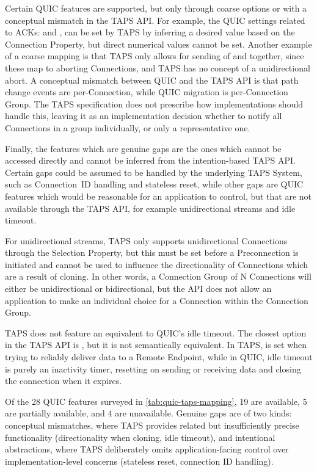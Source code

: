 Certain QUIC features are supported, but only through coarse options or with a conceptual mismatch in the TAPS API.
For example, the QUIC settings related to ACKs:  and ,
can be set by TAPS by inferring a desired value based on the 
Connection Property, but direct numerical values cannot be set.
Another example of a coarse mapping is that TAPS only allows for sending of
 and  together, since these map to
aborting Connections, and TAPS has no concept of a unidirectional abort.
A conceptual mismatch between QUIC and the TAPS API is that path change events are per-Connection,
while QUIC migration is per-Connection Group. The TAPS specification does not prescribe how
implementations should handle this, leaving it as an implementation decision
whether to notify all Connections in a group individually, or only a representative one.

Finally, the features which are genuine gaps are the ones which cannot be accessed directly
and cannot be inferred from the intention-based TAPS API.
Certain gaps could be assumed to be handled by the underlying
TAPS System, such as Connection~ID
handling and stateless reset, while other gaps are QUIC features
which would be reasonable for an application to control, but that are not
available through the TAPS API,
for example unidirectional streams and idle timeout.

For unidirectional streams, TAPS only supports unidirectional Connections through the
 Selection Property, but this must be set before a Preconnection
is initiated and cannot be used to influence
the directionality of Connections which are a result of cloning.
In other words, a Connection Group of N Connections will either be unidirectional
or bidirectional, but the API does not allow an application to make an
individual choice for a Connection within the Connection Group.

TAPS does not feature an equivalent to QUIC's idle timeout. The closest
option in the TAPS API is , but it is not semantically
equivalent. In TAPS,  is set when trying to reliably deliver data to a Remote Endpoint,
while in QUIC, idle timeout is purely an inactivity timer, resetting
on sending or receiving data and closing the connection when it expires.

Of the 28 QUIC features surveyed in \cref{tab:quic-taps-mapping},
19 are available, 5 are partially available, and 4 are
unavailable. Genuine gaps are of two kinds: conceptual mismatches,
where TAPS provides related but insufficiently precise functionality
(directionality when cloning, idle timeout), and intentional abstractions,
where TAPS deliberately omits application-facing control over
implementation-level concerns (stateless reset, connection ID handling).

